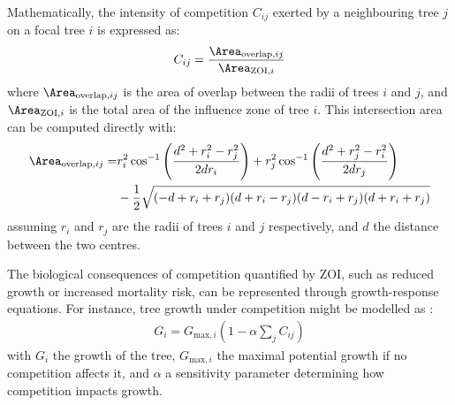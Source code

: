 Mathematically, the intensity of competition $C_{ij}$ exerted by a neighbouring tree $j$ on a focal tree $i$ is expressed as:
\begin{align}
C_{ij} = \frac{ \Area_{\text{overlap}, ij} }{ \Area_{\text{ZOI}, i} }
\end{align}
where $\Area_{\text{overlap}, ij}$ is the area of overlap between the radii of trees $i$ and $j$, and $\Area_{\text{ZOI}, i}$ is the total area of the influence zone of tree $i$. This intersection area can be computed directly with:
\begin{align}
\Area_{\text{overlap}, ij} = &r_i^2 \cos^{-1}\left( \frac{d^2 + r_i^2 - r_j^2}{2 d r_i} \right) + r_j^2 \cos^{-1} \left(\frac{d^2 + r_j^2 - r_i^2}{2 d r_j} \right) \nonumber \\
& - \frac{1}{2} \sqrt{(-d + r_i + r_j)(d + r_i - r_j)(d - r_i + r_j)(d + r_i + r_j)}
\end{align}
assuming $r_i$ and $r_j$ are the radii of trees $i$ and $j$ respectively, and $d$ the distance between the two centres.

The biological consequences of competition quantified by ZOI, such as reduced growth or increased mortality risk, can be represented through growth-response equations. For instance, tree growth under competition might be modelled as \cite{Das2012,Uriarte2004}:
\begin{align}
G_i = G_{\text{max}, i} \left(1 - \alpha \sum_{j} {C_{ij}} \right)
\end{align}
with $G_i$ the growth of the tree, $G_{\text{max}, i}$ the maximal potential growth if no competition affects it, and $\alpha$ a sensitivity parameter determining how competition impacts growth.


